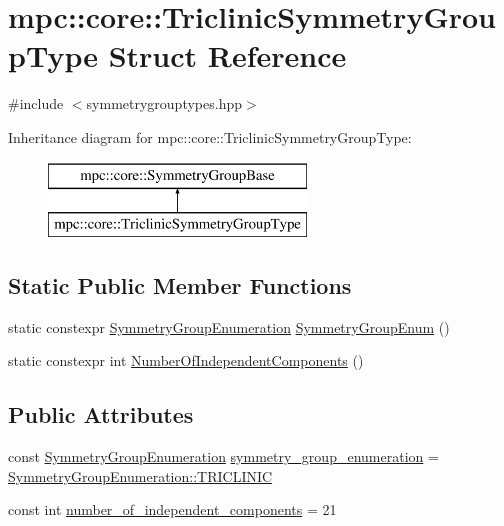 \hypertarget{structmpc_1_1core_1_1_triclinic_symmetry_group_type}{}\section{mpc\+:\+:core\+:\+:Triclinic\+Symmetry\+Group\+Type Struct Reference}
\label{structmpc_1_1core_1_1_triclinic_symmetry_group_type}


{\ttfamily \#include $<$symmetrygrouptypes.\+hpp$>$}

Inheritance diagram for mpc\+:\+:core\+:\+:Triclinic\+Symmetry\+Group\+Type\+:\begin{figure}[H]
\begin{center}
\leavevmode
\includegraphics[height=2.000000cm]{structmpc_1_1core_1_1_triclinic_symmetry_group_type}
\end{center}
\end{figure}
\subsection*{Static Public Member Functions}
\begin{DoxyCompactItemize}
\item 
static constexpr \mbox{\hyperlink{namespacempc_1_1core_a9d979684062547055a0ef5c13077bad8}{Symmetry\+Group\+Enumeration}} \mbox{\hyperlink{structmpc_1_1core_1_1_triclinic_symmetry_group_type_a04032781251ce8fcdd0d2d63f9ed00b6}{Symmetry\+Group\+Enum}} ()
\item 
static constexpr int \mbox{\hyperlink{structmpc_1_1core_1_1_triclinic_symmetry_group_type_a9073ba0fe7514d2b8442ad4281625dd0}{Number\+Of\+Independent\+Components}} ()
\end{DoxyCompactItemize}
\subsection*{Public Attributes}
\begin{DoxyCompactItemize}
\item 
const \mbox{\hyperlink{namespacempc_1_1core_a9d979684062547055a0ef5c13077bad8}{Symmetry\+Group\+Enumeration}} \mbox{\hyperlink{structmpc_1_1core_1_1_triclinic_symmetry_group_type_a7602bf17b1fac2d9043f42928c2356b5}{symmetry\+\_\+group\+\_\+enumeration}} = \mbox{\hyperlink{namespacempc_1_1core_a9d979684062547055a0ef5c13077bad8a049b6e2743d57033eacaea302ca6710a}{Symmetry\+Group\+Enumeration\+::\+T\+R\+I\+C\+L\+I\+N\+IC}}
\item 
const int \mbox{\hyperlink{structmpc_1_1core_1_1_triclinic_symmetry_group_type_aeabbec5646e5b0cefd5b16b0a12e664d}{number\+\_\+of\+\_\+independent\+\_\+components}} = 21
\end{DoxyCompactItemize}


